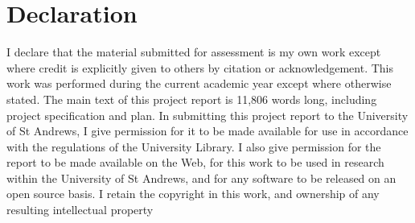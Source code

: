 \documentclass[12pt a4paper]{article}
\begin{document}
\section*{Declaration}
I declare that the material submitted for assessment is my own work except where credit is explicitly given to others by citation or acknowledgement. This work was performed during the current academic year except where otherwise stated. The main text of this project report is 11,806 words long, including project specification and plan. In submitting this project report to the University of St Andrews, I give permission for it to be made available for use in accordance with the regulations of the University Library. I also give permission for the report to be made available on the Web, for this work to be used in research within the University of St Andrews, and for any software to be released on an open source basis. I retain the copyright in this work, and ownership of any resulting intellectual property

\newpage
\tableofcontents
\newpage
\end{document}
